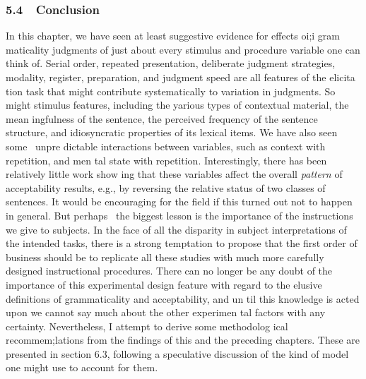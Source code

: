 \clearpage\setcounter{page}{1}\subsubsection[5.4\ \ Conclusion]{5.4\ \ Conclusion}
\begin{styleStandard}
In this chapter, we have seen at least suggestive evidence for effects oi;i gram\- maticality judgments of just about every stimulus and procedure variable one can think of. Serial order, repeated presentation, deliberate judgment strategies, modality, register, preparation, and judgment speed are all features of the elicita\- tion task that might contribute systematically to variation in judgments. So might stimulus features, including the yarious types of contextual material, the mean\- ingfulness of the sentence, the perceived frequency of the sentence structure, and idiosyncratic properties of its lexical items. We have also seen some \ unpre\- dictable interactions between variables, such as context with repetition, and men\- tal state with repetition. Interestingly, there has been relatively little work show\- ing that these variables affect the overall \textit{pattern}\textit{ }of acceptability results, e.g., by reversing the relative status of two classes of sentences. It would be encouraging for the field if this turned out not to happen in general. But perhaps \ the biggest lesson is the importance of the instructions we give to subjects. In the face of all the disparity in subject interpretations of the intended tasks, there is a strong temptation to propose that the first order of business should be to replicate all these studies with much more carefully designed instructional procedures. There can no longer be any doubt of the importance of this experimental design feature with regard to the elusive definitions of grammaticality and acceptability, and un\- til this knowledge is acted upon we cannot say much about the other experimen\- tal factors with any certainty. Nevertheless, I attempt to derive some methodolog\- ical recommem;lations from the findings of this and the preceding chapters. These are presented in section 6.3, following a speculative discussion of the kind of model one might use to account for them.
\end{styleStandard}


